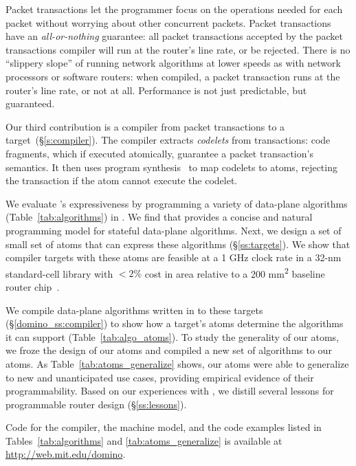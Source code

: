 Packet transactions let the programmer focus on the operations needed for each
packet without worrying about other concurrent packets. Packet transactions
have an \textit{all-or-nothing} guarantee: all packet transactions accepted by
the packet transactions compiler will run at the router's line rate, or be
rejected.  There is no ``slippery slope'' of running network algorithms at
lower speeds as with network processors or software routers: when compiled, a
packet transaction runs at the router's line rate, or not at all.  Performance
is not just predictable, but guaranteed.

Our third contribution is a compiler from \pktlanguage packet transactions to a
\absmachine target~(\S\ref{s:compiler}). The \pktlanguage compiler extracts
{\em codelets} from  transactions: code fragments, which if executed
atomically, guarantee a packet transaction's semantics. It then uses program
synthesis~\cite{sketch_asplos} to map codelets to atoms, rejecting the
transaction if the atom cannot execute the codelet.

We evaluate \pktlanguage's expressiveness by programming a variety of
data-plane algorithms (Table~\ref{tab:algorithms}) in \pktlanguage. We find
that \pktlanguage provides a concise and natural programming model for stateful
data-plane algorithms.  Next, we design a set of small set of atoms that can
express these algorithms (\S\ref{ss:targets}).  We show that compiler targets
with these atoms are feasible at a 1 GHz clock rate in a 32-nm standard-cell
library with $< 2\%$ cost in area relative to a 200 \si{\milli\metre\squared}
baseline router chip~\cite{gibb_parsing}.

We compile data-plane algorithms written in \pktlanguage to these targets
(\S\ref{domino_ss:compiler}) to show how a target's atoms determine the
algorithms it can support (Table~\ref{tab:algo_atoms}). To study the generality
of our atoms, we froze the design of our atoms and compiled a new set of
\pktlanguage algorithms to our atoms. As Table~\ref{tab:atoms_generalize}
shows, our atoms were able to generalize to new and unanticipated use cases,
providing empirical evidence of their programmability. Based on our experiences
with \pktlanguage, we distill several lessons for programmable router design
(\S\ref{ss:lessons}).

Code for the \pktlanguage compiler, the \absmachine machine model, and the code
examples listed in Tables~\ref{tab:algorithms} and \ref{tab:atoms_generalize} is available at
\url{http://web.mit.edu/domino}.
